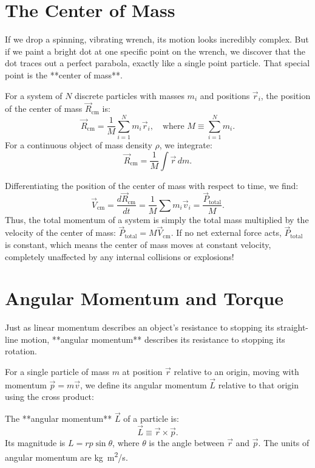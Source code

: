 \section{The Center of Mass}

If we drop a spinning, vibrating wrench, its motion looks incredibly complex. But if we paint a bright dot at one specific point on the wrench, we discover that the dot traces out a perfect parabola, exactly like a single point particle. That special point is the **center of mass**.

\begin{keybox}
For a system of $N$ discrete particles with masses $m_i$ and positions $\vec{r}_i$, the position of the center of mass $\vec{R}_{\text{cm}}$ is:
\begin{equation}
    \vec{R}_{\text{cm}} = \frac{1}{M}\sum_{i=1}^{N} m_i \vec{r}_i, \quad \text{where } M \equiv \sum_{i=1}^{N} m_i.
\end{equation}
For a continuous object of mass density $\rho$, we integrate:
\begin{equation}
    \vec{R}_{\text{cm}} = \frac{1}{M}\int \vec{r}\,dm.
\end{equation}
\end{keybox}

Differentiating the position of the center of mass with respect to time, we find:
\begin{equation}
    \vec{V}_{\text{cm}} = \frac{d\vec{R}_{\text{cm}}}{dt} = \frac{1}{M}\sum m_i \vec{v}_i = \frac{\vec{P}_{\text{total}}}{M}.
\end{equation}
Thus, the total momentum of a system is simply the total mass multiplied by the velocity of the center of mass: $\vec{P}_{\text{total}} = M \vec{V}_{\text{cm}}$. If no net external force acts, $\vec{P}_{\text{total}}$ is constant, which means the center of mass moves at constant velocity, completely unaffected by any internal collisions or explosions!

\section{Angular Momentum and Torque}

Just as linear momentum describes an object's resistance to stopping its straight-line motion, **angular momentum** describes its resistance to stopping its rotation.

For a single particle of mass $m$ at position $\vec{r}$ relative to an origin, moving with momentum $\vec{p} = m\vec{v}$, we define its angular momentum $\vec{L}$ relative to that origin using the cross product:
\begin{keybox}
The **angular momentum** $\vec{L}$ of a particle is:
\begin{equation}
    \vec{L} \equiv \vec{r} \times \vec{p}.
\end{equation}
Its magnitude is $L = r p \sin\theta$, where $\theta$ is the angle between $\vec{r}$ and $\vec{p}$. The units of angular momentum are \si{kg.m^2/s}.
\end{keybox}

